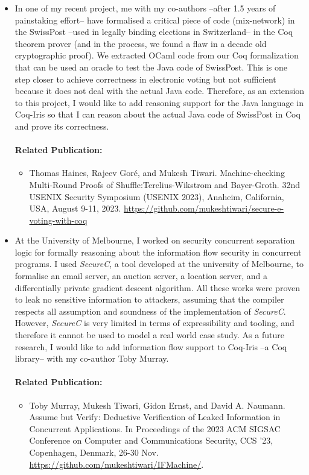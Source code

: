 \documentclass[a4paper]{article}
\begin{document}
\begin{itemize}
\item In one of my recent project, me with my co-authors --after 1.5 years of 
painstaking effort-- have formalised a critical 
piece of code (mix-network) in the SwissPost --used in legally binding elections 
in Switzerland-- in the Coq theorem prover (and in the process, we found a flaw in a decade 
old cryptographic proof). We extracted OCaml code from our Coq formalization that 
can be used an oracle to test the Java code of SwissPost. This is one step closer to 
achieve correctness in electronic voting but not sufficient because it does not 
deal with the actual Java code. Therefore, as an extension to this project, 
I would like to add reasoning support for the Java language in Coq-Iris so that I can 
reason about the actual Java code of SwissPost in Coq and prove 
its correctness.
\paragraph{Related Publication:} 
\begin{itemize}
    \item Thomas Haines, Rajeev Gor{\'e}, and Mukesh Tiwari.
    Machine-checking Multi-Round Proofs of Shuffle:Terelius-Wikstrom and Bayer-Groth. 
    32nd USENIX Security Symposium (USENIX 2023), Anaheim, California, USA, August 9-11, 2023.
    {\url{https://github.com/mukeshtiwari/secure-e-voting-with-coq}}

\end{itemize}


\item At the University of Melbourne, I worked on 
security concurrent separation logic for formally reasoning about the information 
flow security in concurrent programs. I used \textit{SecureC}, a tool developed at the university of 
Melbourne, to formalise an email server, an auction server, a location server, and 
a differentially private gradient descent algorithm. 
All these works were proven to leak no sensitive 
information to attackers, assuming that the compiler respects all 
assumption and soundness of the implementation of \textit{SecureC}. However, 
\textit{SecureC} is very limited in terms of expressibility and tooling, 
and therefore it cannot be used to model a real world case study. As a future research, 
I would like to add information flow support to Coq-Iris --a Coq library-- 
with my co-author Toby Murray.


\paragraph{Related Publication:} 
\begin{itemize}
\item { Toby Murray, Mukesh Tiwari, Gidon Ernst, and David A. Naumann. 
Assume but Verify: Deductive Verification of Leaked Information in Concurrent Applications. 
In Proceedings of the 2023 ACM SIGSAC Conference on 
Computer and Communications Security, CCS '23, Copenhagen, Denmark, 26-30 Nov.}
{\url{https://github.com/mukeshtiwari/IFMachine/}}.
\end{itemize}



\end{itemize}
\end{document}
